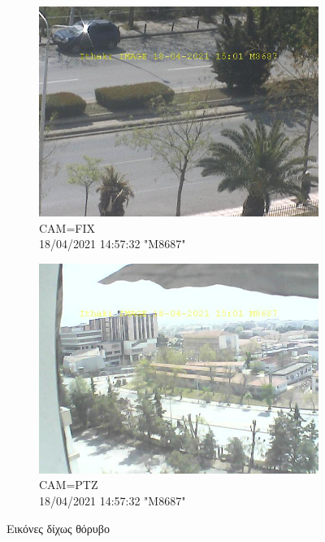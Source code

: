\documentclass[hidelinks, 12pt, a4paper]{article}
\begin{document}
\begin{figure}[h!]
     \begin{subfigure}[b]{0.5\textwidth}
         \centering
         \includegraphics[keepaspectratio, width=\textwidth]{image_error_free_fix.jpg}
         \caption{CAM=FIX \\ 18/04/2021 14:57:32 "M8687"}
     \end{subfigure}
     \begin{subfigure}[b]{0.5\textwidth}
         \centering
         \includegraphics[keepaspectratio, width=\textwidth]{image_error_free_ptz.jpg}
         \caption{CAM=PTZ \\ 18/04/2021 14:57:32 "M8687"}
     \end{subfigure}
     \caption{Εικόνες δίχως θόρυβο}
\end{figure}
\end{document}
